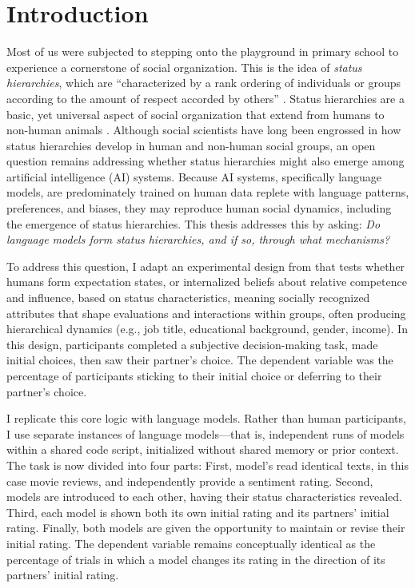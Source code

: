 
\section{Introduction}

Most of us were subjected to stepping onto the playground in primary school to experience a cornerstone of social organization. This is the idea of \textit{status hierarchies}, which are ``characterized by a rank ordering of individuals or groups according to the amount of respect accorded by others'' \citep{Magee-2008-SocialHierarchy}. Status hierarchies are a basic, yet universal aspect of social organization that extend from humans to non-human animals \citep{Ridgeway-2019-Status, Sapolsky-2004-Social, Halevy-2011-Functional}. Although social scientists have long been engrossed in how status hierarchies develop in human and non-human social groups, an open question remains addressing whether status hierarchies might also emerge among artificial intelligence (AI) systems. Because AI systems, specifically language models, are predominately trained on human data replete with language patterns, preferences, and biases, they may reproduce human social dynamics, including the emergence of status hierarchies. This thesis addresses this by asking: \textit{Do language models form status hierarchies, and if so, through what mechanisms?}

To address this question, I adapt an experimental design from \citet{Berger-1972-Status} that tests whether humans form expectation states, or internalized beliefs about relative competence and influence, based on status characteristics, meaning socially recognized attributes that shape evaluations and interactions within groups, often producing hierarchical dynamics (e.g., job title, educational background, gender, income). In this design, participants completed a subjective decision-making task, made initial choices, then saw their partner's choice. The dependent variable was the percentage of participants sticking to their initial choice or deferring to their partner's choice.

I replicate this core logic with language models. Rather than human participants, I use separate instances of language models---that is, independent runs of models within a shared code script, initialized without shared memory or prior context. The task is now divided into four parts: First, model's read identical texts, in this case movie reviews, and independently provide a sentiment rating. Second, models are introduced to each other, having their status characteristics revealed. Third, each model is shown both its own initial rating and its partners' initial rating. Finally, both models are given the opportunity to maintain or revise their initial rating. The dependent variable remains conceptually identical as the percentage of trials in which a model changes its rating in the direction of its partners' initial rating.

